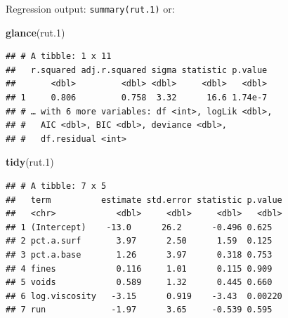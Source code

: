 \documentclass[ignorenonframetext,]{beamer}
\newenvironment{Shaded}{\begin{snugshade}}{\end{snugshade}}
\newcommand{\FloatTok}[1]{\textcolor[rgb]{0.00,0.00,0.81}{#1}}
\newcommand{\KeywordTok}[1]{\textcolor[rgb]{0.13,0.29,0.53}{\textbf{#1}}}
\newcommand{\NormalTok}[1]{#1}
\begin{document}
\begin{frame}[fragile]{Regression output: \texttt{summary(rut.1)} or:}
\protect\hypertarget{regression-output-summaryrut.1-or}{}

\begin{Shaded}
\begin{Highlighting}[]
\KeywordTok{glance}\NormalTok{(rut}\FloatTok{.1}\NormalTok{)}
\end{Highlighting}
\end{Shaded}

\begin{verbatim}
## # A tibble: 1 x 11
##   r.squared adj.r.squared sigma statistic p.value
##       <dbl>         <dbl> <dbl>     <dbl>   <dbl>
## 1     0.806         0.758  3.32      16.6 1.74e-7
## # … with 6 more variables: df <int>, logLik <dbl>,
## #   AIC <dbl>, BIC <dbl>, deviance <dbl>,
## #   df.residual <int>
\end{verbatim}

\begin{Shaded}
\begin{Highlighting}[]
\KeywordTok{tidy}\NormalTok{(rut}\FloatTok{.1}\NormalTok{)}
\end{Highlighting}
\end{Shaded}

\begin{verbatim}
## # A tibble: 7 x 5
##   term          estimate std.error statistic p.value
##   <chr>            <dbl>     <dbl>     <dbl>   <dbl>
## 1 (Intercept)    -13.0      26.2      -0.496 0.625  
## 2 pct.a.surf       3.97      2.50      1.59  0.125  
## 3 pct.a.base       1.26      3.97      0.318 0.753  
## 4 fines            0.116     1.01      0.115 0.909  
## 5 voids            0.589     1.32      0.445 0.660  
## 6 log.viscosity   -3.15      0.919    -3.43  0.00220
## 7 run             -1.97      3.65     -0.539 0.595
\end{verbatim}

\end{frame}
\end{document}
